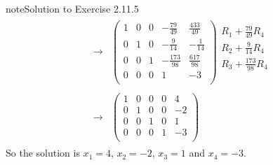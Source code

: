 \documentclass[letterpaper,10pt,english]{jupyterBook}
\begin{document}
\begin{sphinxadmonition}{note}{Solution to Exercise 2.11.5}
\begin{equation*}
\begin{split}
\begin{align*}
    \longrightarrow 
    & \left( \begin{array}{cccc|c} 
         1 & 0 & 0 & - \frac{79}{49} & \frac{433}{49} \\ 
         0 & 1 & 0 & - \frac{9}{14} & - \frac{1}{14} \\ 
         0 & 0 & 1 & - \frac{173}{98} & \frac{617}{98} \\ 
         0 & 0 & 0 & 1 & -3 \\ 
    \end{array} \right) 
    \begin{array}{l} R_{1} + \frac{79}{49} R_{4}\\ R_{2} + \frac{9}{14} R_{4}\\ R_{3} + \frac{173}{98} R_{4}\\ \phantom{x} \end{array} \\ \\ 
    \longrightarrow 
    & \left( \begin{array}{cccc|c} 
         1 & 0 & 0 & 0 & 4 \\ 
         0 & 1 & 0 & 0 & -2 \\ 
         0 & 0 & 1 & 0 & 1 \\ 
         0 & 0 & 0 & 1 & -3 \\ 
    \end{array} \right) 
\end{align*} \end{split}
\end{equation*}
\sphinxAtStartPar
So the solution is \(x_{1} = 4\), \(x_{2} = -2\), \(x_{3} = 1\) and \(x_{4} = -3\).
\end{sphinxadmonition}
 \label{_pages/A2_Linear_systems_exercises_solutions:_pages/A2_Linear_systems_exercises_solutions-solution-5}
\end{document}

